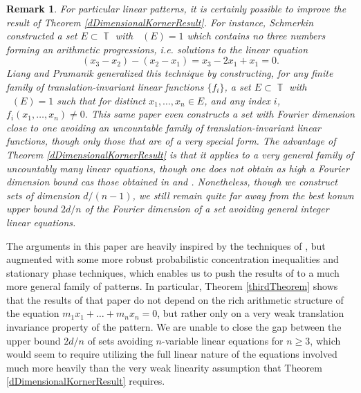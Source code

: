 \documentclass[dvipsnames,letterpaper,12pt]{article}
\numberwithin{equation}{section}
\DeclareMathOperator{\fordim}{\dim_{\mathbb{F}}}
\DeclareMathOperator{\TT}{\mathbb{T}}
\newtheorem{remark}[theorem]{Remark}
\numberwithin{theorem}{section}
\begin{document}
\begin{remark}
    For \emph{particular} linear patterns, it is certainly possible to improve the result of Theorem \ref{dDimensionalKornerResult}. For instance, Schmerkin \cite{Schmerkin} constructed a set $E \subset \TT$ with $\fordim(E) = 1$ which contains no three numbers forming an arithmetic progressions, i.e. solutions to the linear equation
    \[ (x_3 - x_2) - (x_2 - x_1) = x_3 - 2x_1 + x_1 = 0. \]
    Liang and Pramanik \cite{LiangPramanik} generalized this technique by constructing, for any finite family of translation-invariant linear functions $\{ f_i \}$, a set $E \subset \TT$ with $\fordim(E) = 1$ such that for distinct $x_1,\dots,x_n \in E$, and any index $i$, $f_i(x_1,\dots,x_n) \neq 0$. This same paper even constructs a set with Fourier dimension close to one avoiding an uncountable family of translation-invariant linear functions, though only those that are of a very special form. The advantage of Theorem \ref{dDimensionalKornerResult} is that it applies to a very general family of uncountably many linear equations, though one does not obtain as high a Fourier dimension bound cas those obtained in \cite{LiangPramanik} and \cite{Schmerkin}. Nonetheless, though we construct sets of dimension $d/(n-1)$, we still remain quite far away from the best konwn upper bound $2d/n$ of the Fourier dimension of a set avoiding general integer linear equations.
\end{remark}

The arguments in this paper are heavily inspired by the techniques of \cite{Korner2}, but augmented with some more robust probabilistic concentration inequalities and stationary phase techniques, which enables us to push the results of \cite{Korner2} to a much more general family of patterns. In particular, Theorem \ref{thirdTheorem} shows that the results of that paper do not depend on the rich arithmetic structure of the equation $m_1x_1 + \dots + m_nx_n = 0$, but rather only on a very weak translation invariance property of the pattern. We are unable to close the gap between the upper bound $2d/n$ of sets avoiding $n$-variable linear equations for $n \geq 3$, which would seem to require utilizing the full linear nature of the equations involved much more heavily than the very weak linearity assumption that Theorem \ref{dDimensionalKornerResult} requires.

\end{document}
